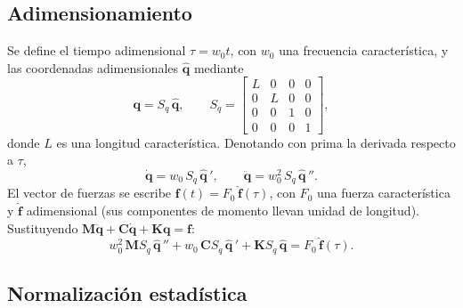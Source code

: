 \subsection{Adimensionamiento}

Se define el tiempo adimensional $\tau=w_0t$, con $w_0$ una frecuencia característica, y las coordenadas 
adimensionales $\hat{\mathbf q}$ mediante
\[
\mathbf q=S_q\,\hat{\mathbf q},\qquad
S_q=\begin{bmatrix}
L&0&0&0\\
0&L&0&0\\
0&0&1&0\\
0&0&0&1
\end{bmatrix},
\]
donde $L$ es una longitud característica. Denotando con prima la derivada respecto a $\tau$,
\[
\dot{\mathbf q}=w_0\,S_q\,\hat{\mathbf q}\,',\qquad
\ddot{\mathbf q}=w_0^2\,S_q\,\hat{\mathbf q}\,''.
\]
El vector de fuerzas se escribe $\mathbf f(t)=F_0\,\hat{\mathbf f}(\tau)$, con $F_0$ una fuerza característica y
 $\hat{\mathbf f}$ adimensional (sus componentes de momento llevan unidad de longitud). Sustituyendo 
  $\mathbf M\ddot{\mathbf q}+\mathbf C\dot{\mathbf q}+\mathbf K\mathbf q=\mathbf f$:
\[
w_0^2\,\mathbf MS_q\,\hat{\mathbf q}\,''+w_0\,\mathbf CS_q\,\hat{\mathbf q}\,'+\mathbf KS_q\,\hat{\mathbf q}=F_0\,\hat{\mathbf f}(\tau).
\]

\subsection{Normalización estadística}

